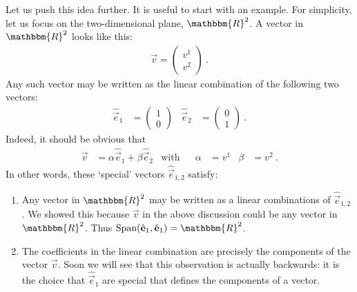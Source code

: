 \documentclass[12pt]{article}
\begin{document}
Let us push this idea further. It is useful to start with an example. For simplicity, let us focus on the two-dimensional plane, $\mathbbm{R}^2$. A vector in $\mathbbm{R}^2$ looks like this:
\begin{align}
    \vec{v} =
    \begin{pmatrix}
        v^1 \\ v^2
    \end{pmatrix} \ .
    \label{eq:v:v1:v2}
\end{align}
Any such vector may be written as the linear combination of the following two vectors:
\begin{align}
    \hat{\vec{e}}_1 &=
    \begin{pmatrix}
        1 \\ 0
    \end{pmatrix}
    &
    \hat{\vec{e}}_2 &=
    \begin{pmatrix}
        0 \\ 1
    \end{pmatrix} \ .
\end{align}
Indeed, it should be obvious that 
\begin{align}
    \vec{v} &= \alpha \hat{\vec{e}}_1 + \beta \hat{\vec{e}}_2
    & \text{with}&
    &\alpha &= v^1
    &\beta &= v^2 \ .
    \label{eq:natural:cartesian:basis}
\end{align}
In other words, these `special' vectors $\hat{\vec{e}}_{1,2}$ satisfy:
\begin{enumerate}
    \item Any vector in $\mathbbm{R}^2$ may be written as a linear combinations of $\hat{\vec{e}}_{1,2}$. We showed this because $\vec{v}$ in the above discussion could be any vector in $\mathbbm{R}^2$. Thus $\text{Span}(\hat{\vec{e}}_{1},\hat{\vec{e}}_{1})=\mathbbm{R}^2$.
    \item The coefficients in the linear combination are precisely the components of the vector $\vec{v}$. Soon we will see that this observation is actually backwards: it is the choice that $\hat{\vec{e}}_{1}$ are special that defines the components of a vector.
\end{enumerate}
\end{document}
